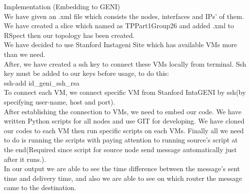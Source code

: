 Implementation (Embedding to GENI)\\
We have given an .xml file which consists the nodes, interfaces and IPs' of them. We have created a slice which named as TPPart1Group26 and added .xml to RSpect then our topology has been created.\\
We have decided to use Stanford Instageni Site which has available VMs more than we need.\\
After, we have created a ssh key to connect these VMs locally from terminal. Ssh key must be added to our keys before usage, to do this:\\
ssh-add id\_geni\_ssh\_rsa\\
To connect each VM, we connect specific VM from Stanford IntaGENI by ssh(by specifying user-name, host and port).\\
After establishing the connection to VMs, we need to embed our code. We have written Python scripts for all nodes and use GIT for developing. We have cloned our codes to each VM then run specific scripts on each VMs. Finally all we need to do is running the scripts with paying attention to running source's script at the end(Required since script for source node send message automatically just after it runs.).\\
In our output we are able to see the time difference between the message's sent time and delivery time, and also we are able to see on which router the message came to the destination.
